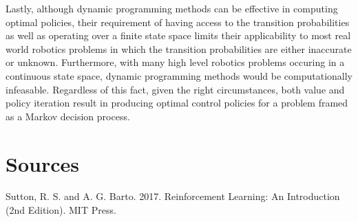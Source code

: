 \documentclass[fullpage]{article}
\begin{document}
Lastly, although dynamic programming methods can be effective in computing optimal policies, their requirement of having access to the transition probabilities as well as operating over a finite state space limits their applicability to most real world robotics problems in which the transition probabilities are either inaccurate or unknown. Furthermore, with many high level robotics problems occuring in a continuous state space, dynamic programming methods would be computationally infeasable. Regardless of this fact, given the right circumstances, both value and policy iteration result in producing optimal control policies for a problem framed as a Markov decision process.

\section{Sources}

Sutton, R. S. and A. G. Barto. 2017. Reinforcement Learning: An Introduction (2nd Edition). MIT Press.
\end{document}
